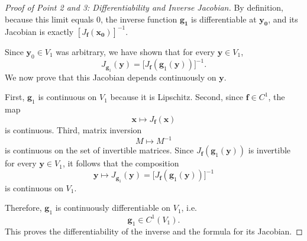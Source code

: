 \documentclass{article}
\begin{document}
\begin{proof}[Proof of Point 2 and 3: Differentiability and Inverse Jacobian]
By definition, because this limit equals 0, the inverse function $\mathbf{g_1}$ is differentiable at $\mathbf{y_0}$, and its Jacobian is exactly $[J_{\mathbf{f}}(\mathbf{x_0})]^{-1}$.

Since $\mathbf y_0\in V_1$ was arbitrary, we have shown that for every $\mathbf y\in V_1$,
\[
J_{\mathbf g_1}(\mathbf y)=\bigl[J_{\mathbf f}(\mathbf g_1(\mathbf y))\bigr]^{-1}.
\]
We now prove that this Jacobian depends continuously on $\mathbf y$.

First, $\mathbf g_1$ is continuous on $V_1$ because it is Lipschitz. Second, since $\mathbf f\in C^1$, the map
\[
\mathbf x\mapsto J_{\mathbf f}(\mathbf x)
\]
is continuous. Third, matrix inversion
\[
M\mapsto M^{-1}
\]
is continuous on the set of invertible matrices. Since $J_{\mathbf f}(\mathbf g_1(\mathbf y))$ is invertible for every $\mathbf y\in V_1$, it follows that the composition
\[
\mathbf y\mapsto J_{\mathbf g_1}(\mathbf y)
=
\bigl[J_{\mathbf f}(\mathbf g_1(\mathbf y))\bigr]^{-1}
\]
is continuous on $V_1$.

Therefore, $\mathbf g_1$ is continuously differentiable on $V_1$, i.e.
\[
\mathbf g_1\in C^1(V_1).
\]
This proves the differentiability of the inverse and the formula for its Jacobian.
\end{proof}
\end{document}
